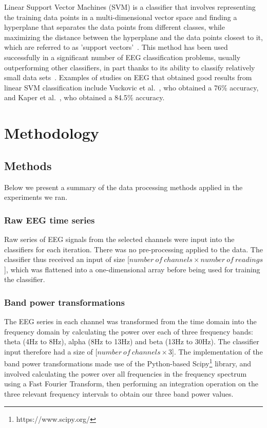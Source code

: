 \documentclass{mpaper}
\begin{document}
Linear Support Vector Machines (SVM) is a classifier that involves representing the training data points in a multi-dimensional vector space and finding a hyperplane that separates the data points from different classes, while maximizing the distance between the hyperplane and the data points closest to it, which are referred to as 'support vectors'~\cite{gandhi_support_2018}. This method has been used successfully in a significant number of EEG classification problems, usually outperforming other classifiers, in part thanks to its ability to classify relatively small data sets~\cite{lotte_review_2007}. Examples of studies on EEG that obtained good results from linear SVM classification include Vuckovic et al.~\cite{vuckovic_prediction_2018}, who obtained a 76\% accuracy, and Kaper et al.~\cite{kaper_bci_2004}, who obtained a 84.5\% accuracy.

\section{Methodology}

\subsection{Methods}

Below we present a summary of the data processing methods applied in the experiments we ran.

\subsubsection{Raw EEG time series}

Raw series of EEG signals from the selected channels were input into the classifiers for each iteration. There was no pre-processing applied to the data. The classifier thus received an input of size [\( number\ of\ channels \times number\ of\ readings \)], which was flattened into a one-dimensional array before being used for training the classifier.

\subsubsection{Band power transformations}
\label{bandpower-method}

The EEG series in each channel was transformed from the time domain into the frequency domain by calculating the power over each of three frequency bands: theta (4Hz to 8Hz), alpha (8Hz to 13Hz) and beta (13Hz to 30Hz). The classifier input therefore had a size of [\( number\ of\ channels \times 3 \)]. The implementation of the band power transformations made use of the Python-based Scipy\footnote{https://www.scipy.org/} library, and involved calculating the power over all frequencies in the frequency spectrum using a Fast Fourier Transform, then performing an integration operation on the three relevant frequency intervals to obtain our three band power values.
\end{document}
